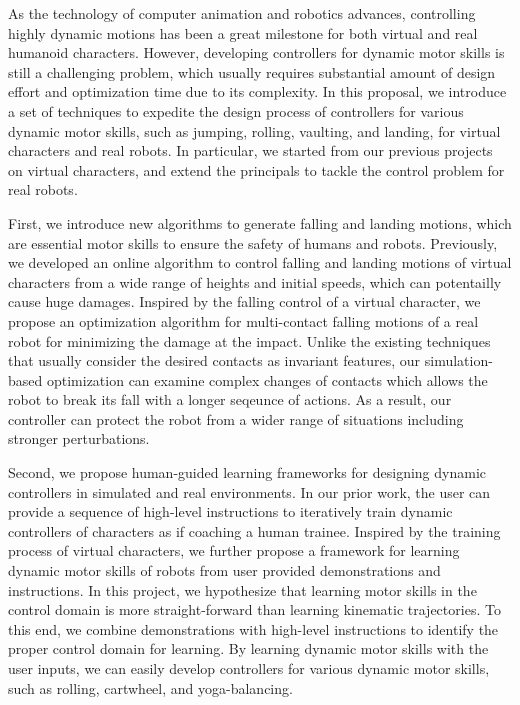\begin{summary}
As the technology of computer animation and robotics advances,
controlling highly dynamic motions
has been a great milestone for both virtual and real humanoid characters.
However, developing controllers for dynamic motor skills is still 
a challenging problem, which usually requires substantial amount of 
design effort and optimization time due to its complexity.
In this proposal, we introduce a set of techniques to expedite the
design process of controllers for various dynamic motor skills, 
such as jumping, rolling, vaulting, and landing, for virtual characters 
and real robots.
In particular, we started from our previous projects on virtual characters,
and extend the principals to tackle the control problem for real robots.

  First, we introduce new algorithms to generate falling and landing motions,
  which are essential motor skills to ensure the safety of humans and robots.
  Previously, we  developed an online algorithm to control falling and 
  landing motions of virtual characters from a wide range of heights 
  and initial speeds, which can potentailly cause huge damages.
  Inspired by the falling control of a virtual character, 
  we propose an optimization algorithm for multi-contact falling
  motions of a real robot for minimizing the damage at the impact.
  Unlike the existing techniques that usually consider the desired contacts 
  as invariant features, 
  our simulation-based optimization can examine complex changes
  of contacts which allows the robot to break its fall with a longer
  seqeunce of actions.
  As a result, our controller can protect the robot from a wider
  range of situations including stronger perturbations.


  Second, we propose human-guided learning frameworks for designing dynamic
  controllers in simulated and real environments.
  In our prior work, the user can provide a sequence of high-level instructions
  to iteratively train dynamic controllers of characters 
  as if coaching a human trainee.
  Inspired by the training process of virtual characters,
  we further propose a framework for learning dynamic motor skills
  of robots from user provided demonstrations and instructions.
  In this project, we hypothesize that learning motor skills in the control domain
  is more straight-forward than learning kinematic trajectories.
  To this end, we combine demonstrations with high-level instructions
  to identify the proper control domain for learning.
  By learning dynamic motor skills with the user inputs, we can easily develop
  controllers for various dynamic motor skills, such as rolling,
  cartwheel, and yoga-balancing.


\end{summary}
